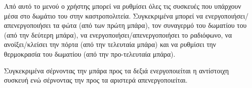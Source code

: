 \documentclass[a4paper,titlepage,twoside,12pt,leqno]{article}
\begin{document}
Από αυτό το μενού ο χρήστης μπορεί να ρυθμίσει όλες τις συσκευές που υπάρχουν μέσα στο δωμάτιο του στην καστροπολιτεία. Συγκεκριμένα μπορεί να ενεργοποιήσει/απενεργοποιήσει τα φώτα (από των πρώτη μπάρα), τον συναγερμό του δωματίου του (από την δεύτερη μπάρα), να ενεργοποιήσει/απενεργοποιήσει το ραδιόφωνο, να ανοίξει/κλείσει την πόρτα (από την τελευταία μπάρα) και να ρυθμίσει την θερμοκρασία του δωματίου (από την προ-τελευταία μπάρα).

Συγκεκριμένα σέρνοντας την μπάρα προς τα δεξιά ενεργοποιείται η αντίστοιχη συσκευή ενώ σέρνοντας την προς τα αριστερά απενεργοποιείται.


\end{document}
